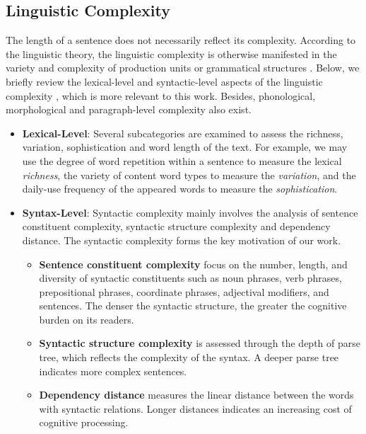 \subsection{Linguistic Complexity}
\label{sec:background:complexity}
The length of a sentence does not necessarily reflect its complexity\cite{Szmrecsanyi2004OnOS}. According to the linguistic theory, the linguistic complexity is otherwise manifested in the variety and complexity of production units or grammatical structures \cite{Yngve1960AMA}. Below, we briefly review the lexical-level and syntactic-level \cite{Yngve1960AMA,Fodor1967SomeSD,Fodor1968SomeSD,Szmrecsanyi2004OnOS} aspects of the linguistic complexity \cite{read_2000}, which is more relevant to this work. Besides, phonological, morphological \cite{morpho} and paragraph-level complexity \cite{Cui2022CTAPFC} also exist.
\begin{itemize}[leftmargin=*]
\item \textbf{Lexical-Level}: Several subcategories are examined to assess the richness, variation, sophistication and word length of the text. For example, we may use the degree of word repetition within a sentence to measure the lexical \textit{richness}, the variety of content word types to measure the \textit{variation}, and the daily-use frequency of the appeared words to measure the \textit{sophistication}.


\item \textbf{Syntax-Level}: Syntactic complexity mainly involves the analysis of sentence constituent complexity, syntactic structure complexity and dependency distance. The syntactic complexity forms the key motivation of our work.
\begin{itemize}
\item \textbf{Sentence constituent complexity} focus on the number, length, and diversity of syntactic constituents such as noun phrases, verb phrases, prepositional phrases, coordinate phrases, adjectival modifiers, and sentences. The denser the syntactic structure, the greater the cognitive burden on its readers. 

\item \textbf{Syntactic structure complexity} is assessed through the depth of parse tree, which reflects the complexity of the syntax. A deeper parse tree indicates more complex sentences. 

\item \textbf{Dependency distance} measures the linear distance between the words with syntactic relations. Longer distances indicates an increasing cost of cognitive processing.
\end{itemize}
\end{itemize}

